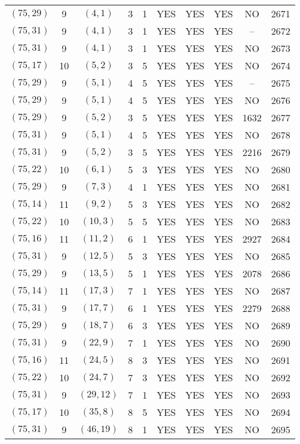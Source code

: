 \begin{longtable}{|c|c|c|c|c|c|c|c|c|c|}
$(75, 29)$ & 9 & $(4, 1)$ & 3 & 1 & YES & YES & YES & NO & 2671\\
$(75, 31)$ & 9 & $(4, 1)$ & 3 & 1 & YES & YES & YES & -- & 2672\\
$(75, 31)$ & 9 & $(4, 1)$ & 3 & 1 & YES & YES & YES & NO & 2673\\
$(75, 17)$ & 10 & $(5, 2)$ & 3 & 5 & YES & YES & YES & NO & 2674\\
$(75, 29)$ & 9 & $(5, 1)$ & 4 & 5 & YES & YES & YES & -- & 2675\\
$(75, 29)$ & 9 & $(5, 1)$ & 4 & 5 & YES & YES & YES & NO & 2676\\
$(75, 29)$ & 9 & $(5, 2)$ & 3 & 5 & YES & YES & YES & 1632 & 2677\\
$(75, 31)$ & 9 & $(5, 1)$ & 4 & 5 & YES & YES & YES & NO & 2678\\
$(75, 31)$ & 9 & $(5, 2)$ & 3 & 5 & YES & YES & YES & 2216 & 2679\\
$(75, 22)$ & 10 & $(6, 1)$ & 5 & 3 & YES & YES & YES & NO & 2680\\
$(75, 29)$ & 9 & $(7, 3)$ & 4 & 1 & YES & YES & YES & NO & 2681\\
$(75, 14)$ & 11 & $(9, 2)$ & 5 & 3 & YES & YES & YES & NO & 2682\\
$(75, 22)$ & 10 & $(10, 3)$ & 5 & 5 & YES & YES & YES & NO & 2683\\
$(75, 16)$ & 11 & $(11, 2)$ & 6 & 1 & YES & YES & YES & 2927 & 2684\\
$(75, 31)$ & 9 & $(12, 5)$ & 5 & 3 & YES & YES & YES & NO & 2685\\
$(75, 29)$ & 9 & $(13, 5)$ & 5 & 1 & YES & YES & YES & 2078 & 2686\\
$(75, 14)$ & 11 & $(17, 3)$ & 7 & 1 & YES & YES & YES & NO & 2687\\
$(75, 31)$ & 9 & $(17, 7)$ & 6 & 1 & YES & YES & YES & 2279 & 2688\\
$(75, 29)$ & 9 & $(18, 7)$ & 6 & 3 & YES & YES & YES & NO & 2689\\
$(75, 31)$ & 9 & $(22, 9)$ & 7 & 1 & YES & YES & YES & NO & 2690\\
$(75, 16)$ & 11 & $(24, 5)$ & 8 & 3 & YES & YES & YES & NO & 2691\\
$(75, 22)$ & 10 & $(24, 7)$ & 7 & 3 & YES & YES & YES & NO & 2692\\
$(75, 31)$ & 9 & $(29, 12)$ & 7 & 1 & YES & YES & YES & NO & 2693\\
$(75, 17)$ & 10 & $(35, 8)$ & 8 & 5 & YES & YES & YES & NO & 2694\\
$(75, 31)$ & 9 & $(46, 19)$ & 8 & 1 & YES & YES & YES & NO & 2695\\

\end{longtable}
